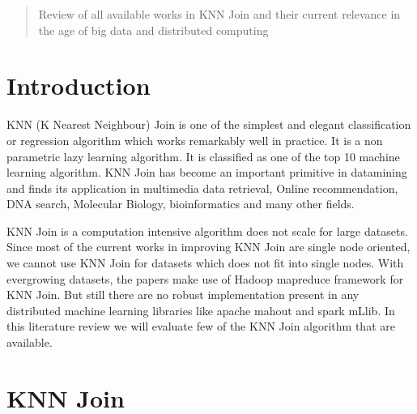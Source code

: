 \documentclass[conference]{IEEEtran}
\begin{document}
\begin{abstract}
Review of all available works in KNN Join and their current relevance
in the age of big data and distributed computing
\end{abstract}





%
\IEEEpeerreviewmaketitle



\section{Introduction}

KNN (K Nearest Neighbour) Join is one of the simplest and elegant
classification or regression algorithm which works remarkably well in
practice. It is a non parametric lazy learning algorithm. It is
classified as one of the top 10 machine learning algorithm. KNN Join
has become an important primitive in datamining and
finds its application in multimedia data retrieval, Online
recommendation, DNA search,
Molecular Biology, bioinformatics  and
many other fields.

\medskip

KNN Join is a computation intensive algorithm does
not scale for large datasets. Since most of the current works in
improving KNN Join are single node oriented, we cannot use KNN Join for datasets which does not fit into single nodes.
With evergrowing datasets, the papers \cite{zhang_efficient_2012}
\cite{lu_efficient_2012} \cite{stupar_rankreduceprocessing_2010} make use of
Hadoop mapreduce framework \cite{_hadoop_mr} for KNN Join. But still there
are no robust implementation present in any distributed machine learning
libraries like apache mahout\cite{_apache_mahout} and spark mLlib\cite{_spark_mLlib}. In this literature review we
will evaluate few of the KNN Join algorithm that are available.

\section{KNN Join}
\end{document}
